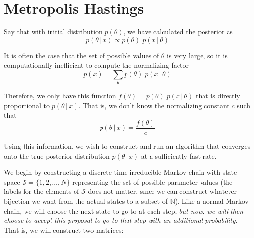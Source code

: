 \section{Metropolis Hastings} 

  Say that with initial distribution $p(\theta)$, we have calculated the posterior as
  \begin{equation}
    p(\theta\,|\,x) \propto p(\theta) \; p(x\,|\,\theta)
  \end{equation}

  It is often the case that the set of possible values of $\theta$ is very large, so it is computationally inefficient to compute the normalizing factor
  \begin{equation}
    p(x) = \sum_\theta p(\theta) \; p(x\,|\,\theta)
  \end{equation}

  Therefore, we only have this function $f(\theta) = p(\theta) \; p(x\,|\,\theta)$ that is directly proportional to $p(\theta\,|\,x)$. That is, we don't know the normalizing constant $c$ such that
  \begin{equation}
    p(\theta\,|\,x) = \frac{f(\theta)}{c}
  \end{equation}

  Using this information, we wish to construct and run an algorithm that converges onto the true posterior distribution $p(\theta\,|\,x)$ at a sufficiently fast rate.

  We begin by constructing a discrete-time irreducible Markov chain with state space $\mathcal{S} = \{1, 2, \ldots, N\}$ representing the set of possible parameter values (the labels for the elements of $\mathcal{S}$ does not matter, since we can construct whatever bijection we want from the actual states to a subset of $\mathbb{N}$). Like a normal Markov chain, we will choose the next state to go to at each step, \textit{but now, we will then choose to accept this proposal to go to that step with an additional probability}. That is, we will construct two matrices:

